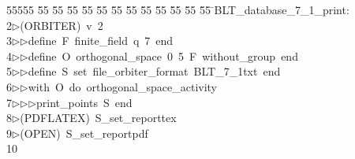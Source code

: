 %
%
\begin{tabbing}
55555 \= 55 \= 55 \= 55 \= 55 \= 55 \= 55 \= 55 \= 55 \= 55 \= 55 \= 55 \= 55 \= \>BLT\_database\_7\_1\_print:\\[0pt]
2\>$\triangleright$\>(ORBITER)\ v\ 2\ \\[0pt]
3\>$\triangleright$\>$\triangleright$\>define\ F\ finite\_field\ q\ 7\ end\ \\[0pt]
4\>$\triangleright$\>$\triangleright$\>define\ O\ orthogonal\_space\ 0\ 5\ F\ without\_group\ end\ \\[0pt]
5\>$\triangleright$\>$\triangleright$\>define\ S\ set\ file\_orbiter\_format\ BLT\_7\_1txt\ end\ \\[0pt]
6\>$\triangleright$\>$\triangleright$\>with\ O\ do\ orthogonal\_space\_activity\ \\[0pt]
7\>$\triangleright$\>$\triangleright$\>$\triangleright$\>print\_points\ S\ end\\[0pt]
8\>$\triangleright$\>(PDFLATEX)\ S\_set\_reporttex\\[0pt]
9\>$\triangleright$\>(OPEN)\ S\_set\_reportpdf\\[0pt]
10\>\end{tabbing}
